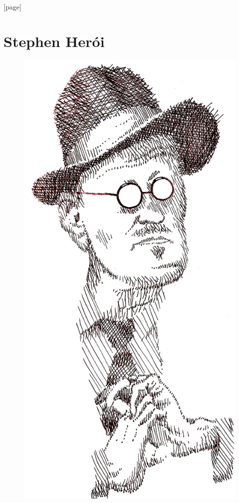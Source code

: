 
[page]
\renewcommand\footnote[2][\stepcounter{symbol}]{#1\NoCaseChange{\Footnote{{\normalsize\fnsymbol{symbol}}}{#2}}}


\makeatletter
\renewcommand\@endpart{\vfil\clearpage}
\makeatother

\part{Stephen Herói}

\begin{figure}[c]
\begin{center}
\includegraphics[width=.6\textwidth]{joyce4.jpg}
\end{center}
\end{figure}

\clearpage


\chapter*{\ } 


